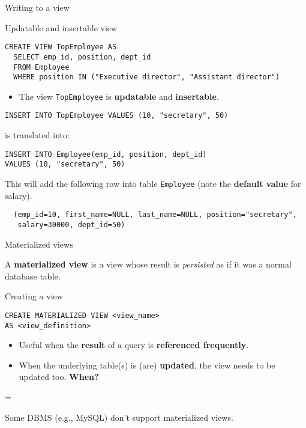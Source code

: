 \documentclass[xcolor=table]{beamer}
\newenvironment{warning}
  {\par\begin{mdframed}[linewidth=2pt,linecolor=darkred]%
    \begin{list}{}{\leftmargin=1cm
                   \labelwidth=\leftmargin}\item[\Large\ding{43}]}
  {\end{list}\end{mdframed}\par}
\begin{document}
\begin{frame}[fragile]{Writing to a view}

  \begin{block}{Updatable and insertable view}
      \footnotesize
\begin{verbatim}
CREATE VIEW TopEmployee AS
  SELECT emp_id, position, dept_id
  FROM Employee
  WHERE position IN ("Executive director", "Assistant director")
\end{verbatim}
  \end{block}
  \vfill
  \begin{itemize}
    \item The view \texttt{TopEmployee} is {\bf updatable} and {\bf insertable}.
  \end{itemize}
  \vfill
  \begin{exampleblock}{}
    \footnotesize{
\begin{verbatim}
INSERT INTO TopEmployee VALUES (10, "secretary", 50)
\end{verbatim}
    }
  is translated into:
  \footnotesize{
\begin{verbatim}
INSERT INTO Employee(emp_id, position, dept_id) 
VALUES (10, "secretary", 50)
\end{verbatim}
  }
This will add the following row into table \texttt{Employee} (note the {\bf default value} for salary).
\begin{verbatim}
  (emp_id=10, first_name=NULL, last_name=NULL, position="secretary", 
   salary=30000, dept_id=50)
\end{verbatim}
\end{exampleblock}
\end{frame}

\begin{frame}[fragile]{Materialized views}

  \begin{definition}
    A {\bf materialized view} is a view 
    whose result is {\em persisted} as if it was 
    a normal database table.
  \end{definition}
  \vfill
  \begin{exampleblock}{Creating a view}
\begin{verbatim}
CREATE MATERIALIZED VIEW <view_name> 
AS <view_definition>
\end{verbatim}
\end{exampleblock}
\vfill
\begin{itemize}
 \item Useful when the {\bf result} of a query is {\bf referenced frequently}.
 \item When the underlying table(s) is (are) {\bf updated}, 
 the view needs to be updated too. {\bf When?}
\end{itemize}
\vfill
\begin{warning}
  Some DBMS (e.g., MySQL) don't support materialized views.
\end{warning}
\end{frame}
\end{document}
